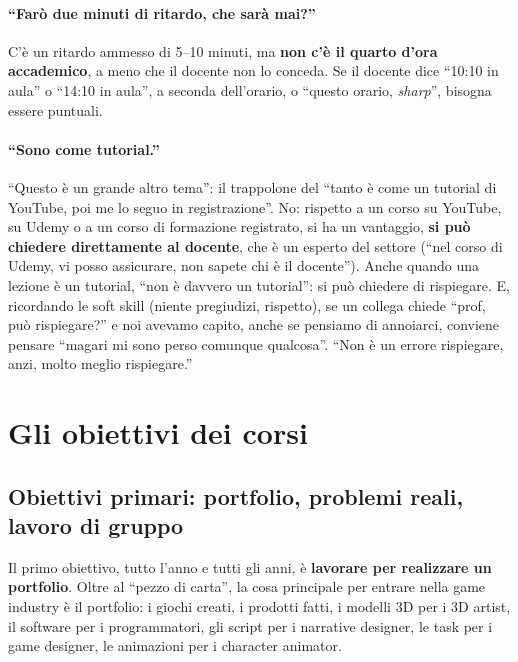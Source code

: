 \paragraph{``Farò due minuti di ritardo, che sarà mai?''} C'è un ritardo
ammesso di 5--10 minuti, ma \textbf{non c'è il quarto d'ora accademico},
a meno che il docente non lo conceda. Se il docente dice ``10:10 in aula'' o
``14:10 in aula'', a seconda dell'orario, o ``questo orario, \emph{sharp}'',
bisogna essere puntuali.

\paragraph{``Sono come tutorial.''} ``Questo è un grande altro tema'': il
trappolone del ``tanto è come un tutorial di YouTube, poi me lo seguo in
registrazione''. No: rispetto a un corso su YouTube, su Udemy o a un corso di
formazione registrato, si ha un vantaggio, \textbf{si può chiedere
direttamente al docente}, che è un esperto del settore (``nel corso di Udemy,
vi posso assicurare, non sapete chi è il docente''). Anche quando una
lezione è un tutorial, ``non è davvero un tutorial'': si può chiedere di
rispiegare. E, ricordando le soft skill (niente pregiudizi, rispetto), se un
collega chiede ``prof, può rispiegare?'' e noi avevamo capito, anche se
pensiamo di annoiarci, conviene pensare ``magari mi sono perso comunque
qualcosa''. ``Non è un errore rispiegare, anzi, molto meglio rispiegare.''

\section{Gli obiettivi dei corsi}
\label{p1:sec:obiettivi}

\subsection{Obiettivi primari: portfolio, problemi reali, lavoro di gruppo}

Il primo obiettivo, tutto l'anno e tutti gli anni, è \textbf{lavorare per
realizzare un portfolio}. Oltre al ``pezzo di carta'', la cosa principale per
entrare nella game industry è il portfolio: i giochi creati, i prodotti
fatti, i modelli 3D per i 3D artist, il software per i programmatori, gli
script per i narrative designer, le task per i game designer, le animazioni
per i character animator.


